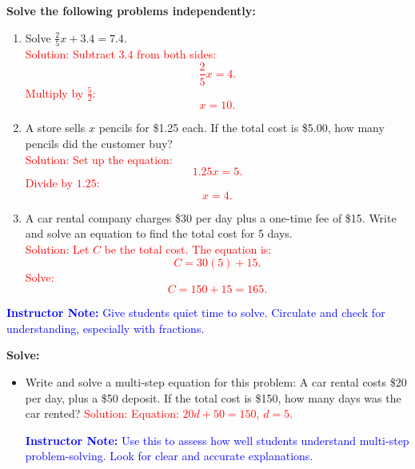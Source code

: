 \documentclass[12pt]{article}
\begin{document}
\begin{tcolorbox}[colframe=black!60, colback=white, 
coltitle=black, colbacktitle=black!15, fonttitle=\bfseries\Large, 
title=Independent Practice, halign title=center, left=10pt, right=10pt, top=10pt, bottom=15pt]
\textbf{Solve the following problems independently:}
\begin{enumerate}[itemsep=3em]
    \item Solve \( \frac{2}{5}x + 3.4 = 7.4 \). \\
    \textcolor{red}{Solution: Subtract \(3.4\) from both sides:
    \[
    \frac{2}{5}x = 4.
    \]
    Multiply by \(\frac{5}{2}\):
    \[
    x = 10.
    \]}

    \item A store sells \( x \) pencils for \$1.25 each. If the total cost is \$5.00, how many pencils did the customer buy? \\
    \textcolor{red}{Solution: Set up the equation:
    \[
    1.25x = 5.
    \]
    Divide by \(1.25\):
    \[
    x = 4.
    \]}

    \item A car rental company charges \$30 per day plus a one-time fee of \$15. Write and solve an equation to find the total cost for 5 days. \\
    \textcolor{red}{Solution: Let \( C \) be the total cost. The equation is:
    \[
    C = 30(5) + 15.
    \]
    Solve:
    \[
    C = 150 + 15 = 165.
    \]}
\end{enumerate}

\textcolor{blue}{\textbf{Instructor Note:} Give students quiet time to solve. Circulate and check for understanding, especially with fractions.}
\end{tcolorbox}

\vspace{1em}

\begin{tcolorbox}[colframe=black!60, colback=white, 
coltitle=black, colbacktitle=black!15, fonttitle=\bfseries\Large, 
title=Exit Ticket, halign title=center, left=10pt, right=10pt, top=10pt, bottom=15pt]
\textbf{Solve:}
\begin{itemize}
    \item Write and solve a multi-step equation for this problem: A car rental costs \$20 per day, plus a \$50 deposit. If the total cost is \$150, how many days was the car rented? \textcolor{red}{Solution: Equation: \( 20d + 50 = 150 \), \( d = 5 \).}

    \textcolor{blue}{\textbf{Instructor Note:} Use this to assess how well students understand multi-step problem-solving. Look for clear and accurate explanations.}
\end{itemize}
\end{tcolorbox}
\end{document}
